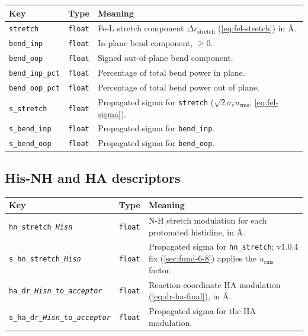 \documentclass[10pt,a4paper,twoside]{article}
\newcommand{\urms}{u_{\mathrm{rms}}}
\begin{document}
\begin{longtable}{p{} p{} p{}}
\toprule
\textbf{Key} & \textbf{Type} & \textbf{Meaning} \\
\midrule
\texttt{stretch} & \texttt{float}
  & Fe-L stretch component $\Delta r_\text{stretch}$
    (\cref{eq:fel-stretch}) in \AA{}. \\
\texttt{bend\_inp} & \texttt{float}
  & In-plane bend component, $\geq 0$. \\
\texttt{bend\_oop} & \texttt{float}
  & Signed out-of-plane bend component. \\
\texttt{bend\_inp\_pct} & \texttt{float}
  & Percentage of total bend power in plane. \\
\texttt{bend\_oop\_pct} & \texttt{float}
  & Percentage of total bend power out of plane. \\
\texttt{s\_stretch} & \texttt{float}
  & Propagated sigma for \texttt{stretch}
    ($\sqrt{2}\sigma_e \urms$, \cref{eq:fel-sigma}). \\
\texttt{s\_bend\_inp} & \texttt{float}
  & Propagated sigma for \texttt{bend\_inp}. \\
\texttt{s\_bend\_oop} & \texttt{float}
  & Propagated sigma for \texttt{bend\_oop}. \\
\bottomrule
\end{longtable}

\subsection{His-NH and HA descriptors}

\begin{longtable}{p{} p{} p{}}
\toprule
\textbf{Key} & \textbf{Type} & \textbf{Meaning} \\
\midrule
\texttt{hn\_stretch\_\textit{Hisn}} & \texttt{float}
  & N-H stretch modulation for each protonated histidine, in \AA{}. \\
\texttt{s\_hn\_stretch\_\textit{Hisn}} & \texttt{float}
  & Propagated sigma for \texttt{hn\_stretch}; v1.0.4 fix
    (\cref{sec:fund-6-8}) applies the $\urms$ factor. \\
\texttt{ha\_dr\_\textit{Hisn}\_to\_\textit{acceptor}} & \texttt{float}
  & Reaction-coordinate HA modulation
    (\cref{eq:dr-ha-final}), in \AA{}. \\
\texttt{s\_ha\_dr\_\textit{Hisn}\_to\_\textit{acceptor}} & \texttt{float}
  & Propagated sigma for the HA modulation. \\
\bottomrule
\end{longtable}
\end{document}

